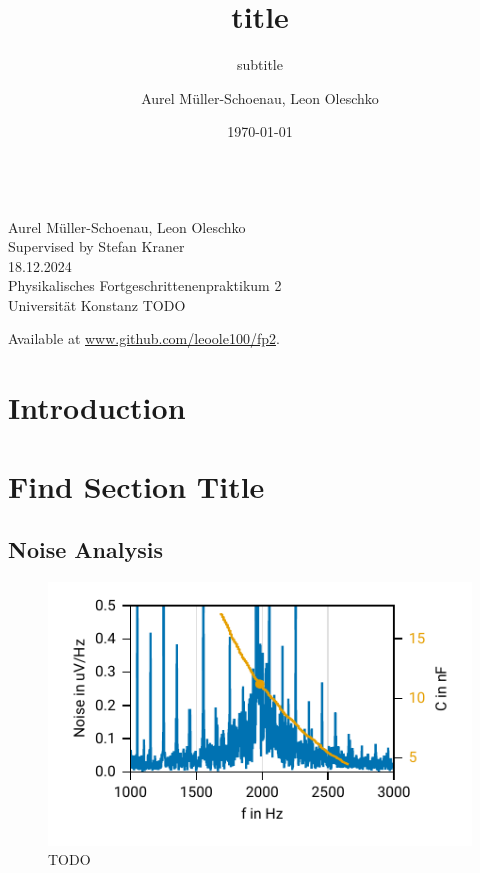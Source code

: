 \documentclass[
    parskip=half, 
    twoside=false,
    twocolumn=true,
    fontsize=11pt,
]{scrarticle}
\begin{document}
\title{title}
\subtitle{subtitle}
\author{Aurel Müller-Schoenau, Leon Oleschko}
\date{\dotdate\today}


\begin{titlepage}
    \sffamily
    \vspace*{3cm}
    {
        \fontsize{32}{32}
    }
    \vspace{.25cm}\\
    {
        \Large
        Aurel Müller-Schoenau, Leon Oleschko\\
        Supervised by Stefan Kraner
        \vspace{.05cm}\\
        18.12.2024
        \vspace{.25cm}\\
        \normalsize
        Physikalisches Fortgeschrittenenpraktikum 2\\
        Universität Konstanz
    }
    \vfill
    {
        \normalfont\normalsize 
        TODO
    }
    \vfill
    \begin{flushright}
        Available at \url{www.github.com/leoole100/fp2}.
    \end{flushright}
\end{titlepage}

\section{Introduction}

\section{Find Section Title}

\subsection{Noise Analysis}
\begin{figure}
    \centering
    \includegraphics{figures/01 noise.pdf}
    \caption{TODO}
\end{figure}
\end{document}
